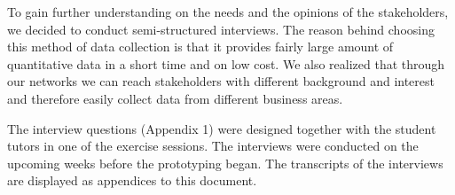To gain further understanding on the needs and the opinions of the stakeholders, we decided to conduct semi-structured interviews. The reason behind choosing this method of data collection is that it provides fairly large amount of quantitative data in a short time and on low cost. We also realized that through our networks we can reach stakeholders with different background and interest and therefore easily collect data from different business areas. 

The interview questions (Appendix 1) were designed together with the student tutors in one of the exercise sessions. The interviews were conducted on the upcoming weeks before the prototyping began. The transcripts of the interviews are displayed as appendices to this document. 


